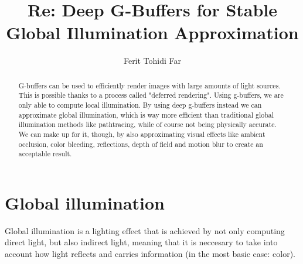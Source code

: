 \documentclass{ACGSeminar}
\begin{document}
\title{Re: Deep G-Buffers for Stable Global Illumination Approximation}

\author{Ferit Tohidi Far}

\maketitle


\begin{abstract}%
G-buffers can be used to efficiently render images with large amounts of light sources. This is possible thanks to a process called "deferred rendering". Using 
g-buffers, we are only able to compute local illumination. By using deep g-buffers instead we can approximate global illumination, which is way more 
efficient than traditional global illumination methods like pathtracing, while of course not being physically accurate. We can make up for it, though, by also
approximating visual effects like ambient occlusion, color bleeding, reflections, depth of field and motion blur to create an acceptable result.
\end{abstract}

\tableofcontents

\label{cha:references}

\newpage

\label{cha:introduction}
\section{Global illumination}
	Global illumination is a lighting effect that is achieved by not only computing direct light, but also indirect light, meaning that it is neccesary to take
	into account how light reflects and carries information (in the most basic case: color).
\end{document}

